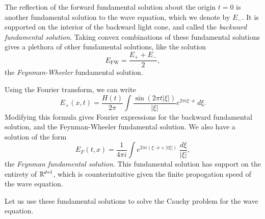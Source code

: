 The reflection of the forward fundamental solution about the origin $t = 0$ is another fundamental solution to the wave equation, which we denote by $E_-$. It is supported on the interior of the backward light cone, and called the \emph{backward fundamental solution}. Taking convex combinations of these fundamental solutions gives a plethora of other fundamental solutions, like the solution
%
\[ E_{\text{FW}} = \frac{E_+ + E_-}{2}, \]
%
the \emph{Feynman-Wheeler} fundamental solution.

Using the Fourier transform, we can write
%
\[ E_+(x,t) = \frac{H(t)}{2 \pi} \int \frac{\sin(2 \pi t |\xi|)}{|\xi|} e^{2 \pi i \xi \cdot x}\; d\xi. \]
%
Modifying this formula gives Fourier expressions for the backward fundamental solution, and the Feynman-Wheeler fundamental solution. We also have a solution of the form
%
\[ E_F(t,x) = \frac{1}{4 \pi i} \int e^{2 \pi i (\xi \cdot x + |t \xi|)}\; \frac{d\xi}{|\xi|}, \]
%
the \emph{Feynman fundamental solution}. This fundamental solution has support on the entirety of $\operatorname{\mathbb{R}}^{d+1}$, which is counterintuitive given the finite propogation speed of the wave equation.

Let us use these fundamental solutions to solve the Cauchy problem for the wave equation.

